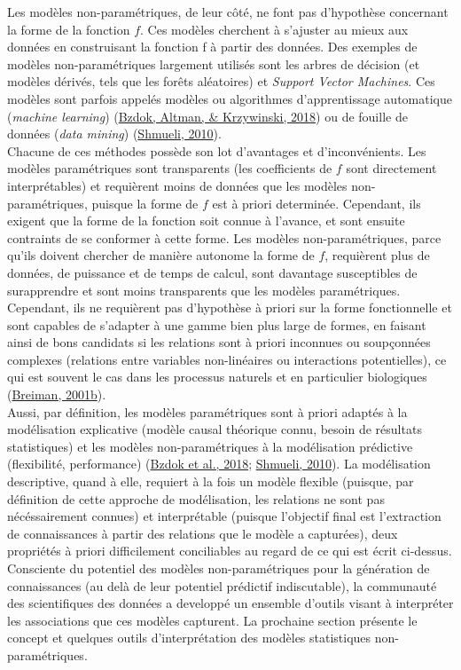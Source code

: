 \documentclass[12pt,twoside]{reedthesis}
\begin{document}
Les modèles non-paramétriques, de leur côté, ne font pas d'hypothèse concernant la forme de la fonction \(f\). Ces modèles cherchent à s'ajuster au mieux aux données en construisant la fonction f à partir des données. Des exemples de modèles non-paramétriques largement utilisés sont les arbres de décision (et modèles dérivés, tels que les forêts aléatoires) et \emph{Support Vector Machines}. Ces modèles sont parfois appelés modèles ou algorithmes d'apprentissage automatique (\emph{machine learning}) (\protect\hyperlink{ref-bzdok_statistics_2018}{Bzdok, Altman, \& Krzywinski, 2018}) ou de fouille de données (\emph{data mining}) (\protect\hyperlink{ref-shmueli_explain_2010}{Shmueli, 2010}).\\

Chacune de ces méthodes possède son lot d'avantages et d'inconvénients. Les modèles paramétriques sont transparents (les coefficients de \(f\) sont directement interprétables) et requièrent moins de données que les modèles non-paramétriques, puisque la forme de \(f\) est à priori determinée. Cependant, ils exigent que la forme de la fonction soit connue à l'avance, et sont ensuite contraints de se conformer à cette forme. Les modèles non-paramétriques, parce qu'ils doivent chercher de manière autonome la forme de \(f\), requièrent plus de données, de puissance et de temps de calcul, sont davantage susceptibles de surapprendre et sont moins transparents que les modèles paramétriques. Cependant, ils ne requièrent pas d'hypothèse à priori sur la forme fonctionnelle et sont capables de s'adapter à une gamme bien plus large de formes, en faisant ainsi de bons candidats si les relations sont à priori inconnues ou soupçonnées complexes (relations entre variables non-linéaires ou interactions potentielles), ce qui est souvent le cas dans les processus naturels et en particulier biologiques (\protect\hyperlink{ref-breiman_statistical_2001}{Breiman, 2001b}).\\

Aussi, par définition, les modèles paramétriques sont à priori adaptés à la modélisation explicative (modèle causal théorique connu, besoin de résultats statistiques) et les modèles non-paramétriques à la modélisation prédictive (flexibilité, performance) (\protect\hyperlink{ref-bzdok_statistics_2018}{Bzdok et al., 2018}; \protect\hyperlink{ref-shmueli_explain_2010}{Shmueli, 2010}). La modélisation descriptive, quand à elle, requiert à la fois un modèle flexible (puisque, par définition de cette approche de modélisation, les relations ne sont pas nécéssairement connues) et interprétable (puisque l'objectif final est l'extraction de connaissances à partir des relations que le modèle a capturées), deux propriétés à priori difficilement conciliables au regard de ce qui est écrit ci-dessus. Consciente du potentiel des modèles non-paramétriques pour la génération de connaissances (au delà de leur potentiel prédictif indiscutable), la communauté des scientifiques des données a developpé un ensemble d'outils visant à interpréter les associations que ces modèles capturent. La prochaine section présente le concept et quelques outils d'interprétation des modèles statistiques non-paramétriques.\\
\end{document}
